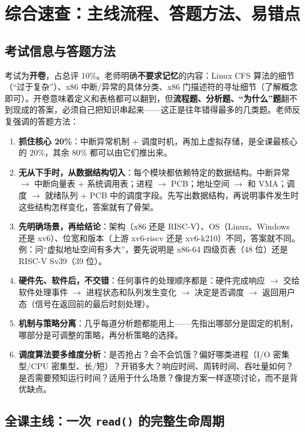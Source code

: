 \section{综合速查：主线流程、答题方法、易错点}

\subsection{考试信息与答题方法}

考试为\textbf{开卷}，占总评 10\%。老师明确\textbf{不要求记忆}的内容：Linux CFS 算法的细节（“过于复杂”）、x86 中断/异常的具体分类、x86 门描述符的寻址细节（了解概念即可）。开卷意味着定义和表格都可以翻到，但\textbf{流程题、分析题、“为什么”题}翻不到现成的答案，必须自己把知识串起来——这正是往年错得最多的几类题。老师反复强调的答题方法：
\begin{enumerate}
    \item \textbf{抓住核心 20\%}：中断异常机制 + 调度时机，再加上虚拟存储，是全课最核心的 20\%，其余 80\% 都可以由它们推出来。
    \item \textbf{无从下手时，从数据结构切入}：每个模块都依赖特定的数据结构。中断异常 $\to$ 中断向量表 + 系统调用表；进程 $\to$ PCB；地址空间 $\to$  和 VMA；调度 $\to$ 就绪队列 + PCB 中的调度字段。先写出数据结构，再说明事件发生时这些结构怎样变化，答案就有了骨架。
    \item \textbf{先明确场景，再给结论}：架构（x86 还是 RISC-V）、OS（Linux、Windows 还是 xv6）、位宽和版本（上游 xv6-riscv 还是 xv6-k210）不同，答案就不同。例：问“虚拟地址空间有多大”，要先说明是 x86-64 四级页表（48 位）还是 RISC-V Sv39（39 位）。
    \item \textbf{硬件先、软件后，不交错}：任何事件的处理顺序都是：硬件完成响应 $\to$ 交给软件处理事件 $\to$ 进程状态和队列发生变化 $\to$ 决定是否调度 $\to$ 返回用户态（信号在返回前的最后时刻处理）。
    \item \textbf{机制与策略分离}：几乎每道分析题都能用上——先指出哪部分是固定的机制，哪部分是可调整的策略，再分析策略的选择。
    \item \textbf{调度算法要多维度分析}：是否抢占？会不会饥饿？偏好哪类进程（I/O 密集型/CPU 密集型、长/短）？开销多大？响应时间、周转时间、吞吐量如何？是否需要预知运行时间？适用于什么场景？像提方案一样逐项讨论，而不是背优缺点。
\end{enumerate}

\subsection{全课主线：一次 \texttt{read()} 的完整生命周期 \bk}

